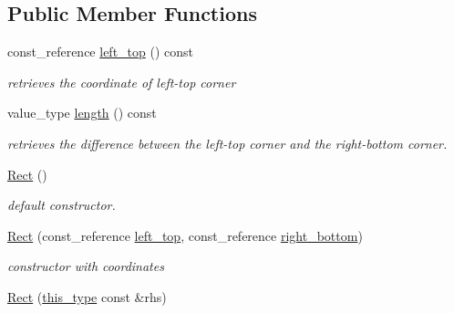 \subsection*{Public Member Functions}
\begin{DoxyCompactItemize}
\item 
\hypertarget{classhryky_1_1geometry_1_1_rect_aad79f890789ec023b8493f263066d8e4}{const\-\_\-reference \hyperlink{classhryky_1_1geometry_1_1_rect_aad79f890789ec023b8493f263066d8e4}{left\-\_\-top} () const }\label{classhryky_1_1geometry_1_1_rect_aad79f890789ec023b8493f263066d8e4}

\begin{DoxyCompactList}\small\item\em retrieves the coordinate of left-\/top corner \end{DoxyCompactList}\item 
\hypertarget{classhryky_1_1geometry_1_1_rect_a92d8a437f4d54cd3c4d6f1dce403471b}{value\-\_\-type \hyperlink{classhryky_1_1geometry_1_1_rect_a92d8a437f4d54cd3c4d6f1dce403471b}{length} () const }\label{classhryky_1_1geometry_1_1_rect_a92d8a437f4d54cd3c4d6f1dce403471b}

\begin{DoxyCompactList}\small\item\em retrieves the difference between the left-\/top corner and the right-\/bottom corner. \end{DoxyCompactList}\item 
\hypertarget{classhryky_1_1geometry_1_1_rect_a3bb8fabed9313fa56ca6e44a2cc156c0}{\hyperlink{classhryky_1_1geometry_1_1_rect_a3bb8fabed9313fa56ca6e44a2cc156c0}{Rect} ()}\label{classhryky_1_1geometry_1_1_rect_a3bb8fabed9313fa56ca6e44a2cc156c0}

\begin{DoxyCompactList}\small\item\em default constructor. \end{DoxyCompactList}\item 
\hypertarget{classhryky_1_1geometry_1_1_rect_ada428478c9a7ac1e0d8a004c5a976489}{\hyperlink{classhryky_1_1geometry_1_1_rect_ada428478c9a7ac1e0d8a004c5a976489}{Rect} (const\-\_\-reference \hyperlink{classhryky_1_1geometry_1_1_rect_aad79f890789ec023b8493f263066d8e4}{left\-\_\-top}, const\-\_\-reference \hyperlink{classhryky_1_1geometry_1_1_rect_a28bb3b1a495b06aad499d7a5384b1a9c}{right\-\_\-bottom})}\label{classhryky_1_1geometry_1_1_rect_ada428478c9a7ac1e0d8a004c5a976489}

\begin{DoxyCompactList}\small\item\em constructor with coordinates \end{DoxyCompactList}\item 
\hypertarget{classhryky_1_1geometry_1_1_rect_af6f3fedfa501e9e9115afe805f0aae27}{\hyperlink{classhryky_1_1geometry_1_1_rect_af6f3fedfa501e9e9115afe805f0aae27}{Rect} (\hyperlink{classhryky_1_1geometry_1_1_rect_a0e04e42565acd9601e538620a8cff1b2}{this\-\_\-type} const \&rhs)}\label{classhryky_1_1geometry_1_1_rect_af6f3fedfa501e9e9115afe805f0aae27}


\end{DoxyCompactItemize}
